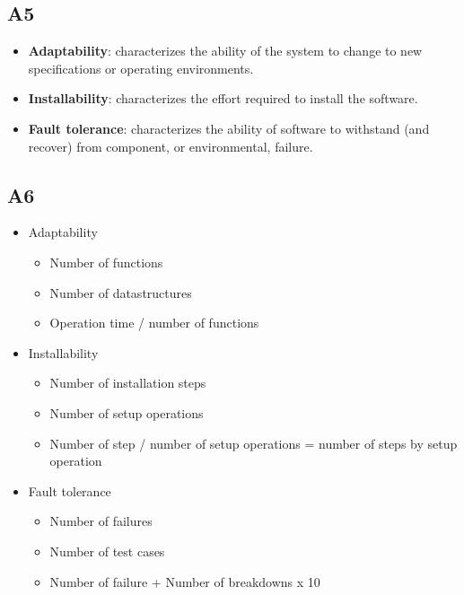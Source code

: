 \subsection*{A5}
    \begin{itemize}
        \item \textbf{Adaptability}: characterizes the ability of the system to change to new specifications or operating environments.
        \item \textbf{Installability}: characterizes the effort required to install the software.
        \item \textbf{Fault tolerance}: characterizes the ability of software to withstand (and recover) from component, or environmental, failure.
    \end{itemize}

\subsection*{A6}
    \begin{itemize}
        \item Adaptability
            \begin{itemize}
                \item Number of functions
                \item Number of datastructures
                \item Operation time / number of functions
            \end{itemize}
        \item Installability
            \begin{itemize}
                \item Number of installation steps
                \item Number of setup operations
                \item Number of step / number of setup operations = number of steps by setup operation
            \end{itemize}
        \item Fault tolerance
            \begin{itemize}
                \item Number of failures
                \item Number of test cases
                \item Number of failure + Number of breakdowns x 10
            \end{itemize}
    \end{itemize}

